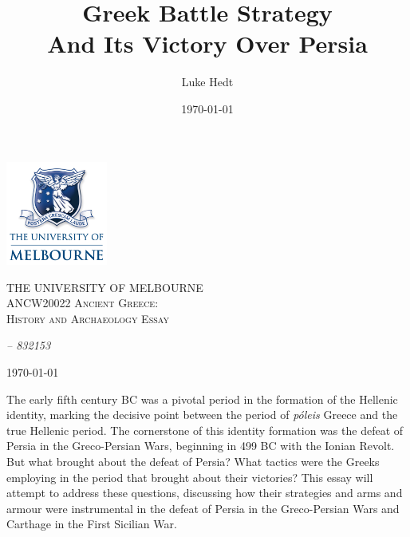 \documentclass[twoside, a4paper, 12pt]{article}
\title{Greek Battle Strategy \\ And Its Victory Over Persia}
\author{Luke Hedt}
\date{\today}
\begin{document}
\begin{titlepage}
    \centering
    \includegraphics[width=0.25\textwidth]{UniLogo.png}\par\vspace{1cm}
    {\scshape\Large THE UNIVERSITY OF MELBOURNE \\
              \large ANCW20022 Ancient Greece: \\
              History and Archaeology Essay\par}
    \vspace{1.5cm}
    {\Huge \thetitle \par}
    \vfill

    {\Large\itshape \theauthor \hspace{1em} -- \hspace{1em} 832153 \par}
    \vspace{1.5cm}
    {\Large \today}
\end{titlepage}
\pagestyle{plain}

The early fifth century BC was a pivotal period in the formation of the Hellenic
identity, marking the decisive point between the period of \emph{p{\'o}leis} Greece
and the true Hellenic period. The cornerstone of this identity formation
was the defeat of Persia in the Greco-Persian Wars, beginning in 499 BC
with the Ionian Revolt. But what brought about the defeat of Persia? What tactics
were the Greeks employing in the period that brought about their victories?
This essay will attempt to address these questions, discussing how their
strategies and arms and armour were instrumental in the defeat of Persia
in the Greco-Persian Wars and
Carthage in the First Sicilian War.

\par\vspace{1em}
\end{document}
